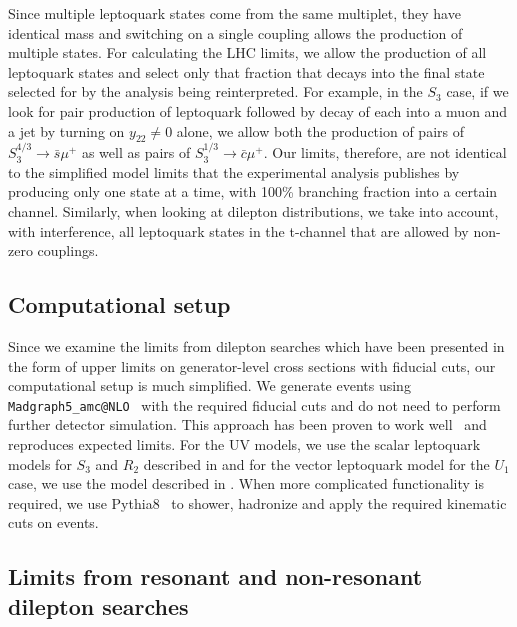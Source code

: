 \documentclass[12pt]{revtex4-2}
\numberwithin{equation}{section}
\begin{document}
Since multiple leptoquark states come from the same multiplet, they have identical mass and switching on a single coupling allows the production of multiple states.  For calculating the LHC limits, we allow the production of all leptoquark states and select only that fraction that decays into the final state selected for by the analysis being reinterpreted.  For example, in the $S_3$ case, if we look for pair production of leptoquark followed by decay of each into a muon and a jet by turning on $y_{22} \neq 0$ alone, we allow both the production of pairs of $S_3^{4/3} \rightarrow \bar s \mu^+$ as well as pairs of $S_3^{1/3} \rightarrow \bar c \mu^+$.  Our limits, therefore, are not identical to the simplified model limits that the experimental analysis publishes by producing only one state at a time, with 100\% branching fraction into a certain channel.  Similarly, when looking at dilepton distributions, we take into account, with interference, all leptoquark states in the t-channel that are allowed by non-zero couplings.  




\subsection{Computational setup}

Since we examine the limits from dilepton searches which have been presented in the form of upper limits on generator-level cross sections with fiducial cuts, our computational setup is much simplified.  We generate events using \texttt{ Madgraph5\_amc@NLO}~\cite{Alwall:2011uj} with the required fiducial cuts and do not need to perform further detector simulation.  This approach has been proven to work well~\cite{Bhatia:2021eco} and reproduces expected limits.  For the UV models, we use the scalar leptoquark models for $S_3$ and $R_2$ described in \cite{Dorsner:2018ynv} and for the vector leptoquark model for the $U_1$ case, we use the model described in \cite{Baker:2019sli, DiLuzio:2018zxy, Cornella:2021sby}.  When more complicated functionality is required, we use Pythia8~\cite{Bierlich:2022pfr} to shower, hadronize and apply the required kinematic cuts on events.

\subsection{Limits from resonant and non-resonant dilepton searches}
\end{document}
